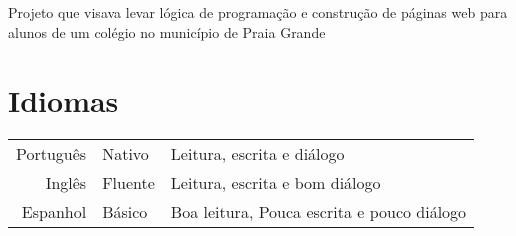 \documentclass[]{deedy-resume-openfont}
\begin{document}
\begin{minipage}[t]{0.66\textwidth}
Projeto que visava levar lógica de programação e construção de páginas web para alunos de um colégio no município de Praia Grande \sectionsep


\section{Idiomas} 
\begin{tabular}{rll}
Português	    & Nativo  & Leitura, escrita e diálogo\\
Inglês	     	& Fluente & Leitura, escrita e bom diálogo\\
Espanhol		& Básico  & Boa leitura, Pouca escrita e pouco diálogo\\
\end{tabular}
\sectionsep

\end{minipage} 
\end{document}
